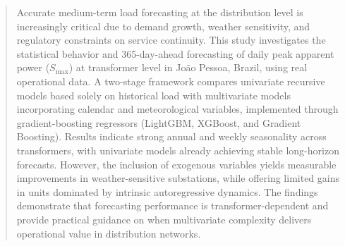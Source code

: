 
\author{Ruan Carlos Virginio dos Santos         \and
        Diego Ernesto Rosa Pessoa \and Thiago José Marques Moura%
}



\date{Received: date / Accepted: date}


\maketitle

\begin{abstract}
Accurate medium-term load forecasting at the distribution level is increasingly critical due to demand growth, weather sensitivity, and regulatory constraints on service continuity. This study investigates the statistical behavior and 365-day-ahead forecasting of daily peak apparent power ($S_{\max}$) at transformer level in João Pessoa, Brazil, using real operational data. A two-stage framework compares univariate recursive models based solely on historical load with multivariate models incorporating calendar and meteorological variables, implemented through gradient-boosting regressors (LightGBM, XGBoost, and Gradient Boosting). Results indicate strong annual and weekly seasonality across transformers, with univariate models already achieving stable long-horizon forecasts. However, the inclusion of exogenous variables yields measurable improvements in weather-sensitive substations, while offering limited gains in units dominated by intrinsic autoregressive dynamics. The findings demonstrate that forecasting performance is transformer-dependent and provide practical guidance on when multivariate complexity delivers operational value in distribution networks.

\end{abstract}



